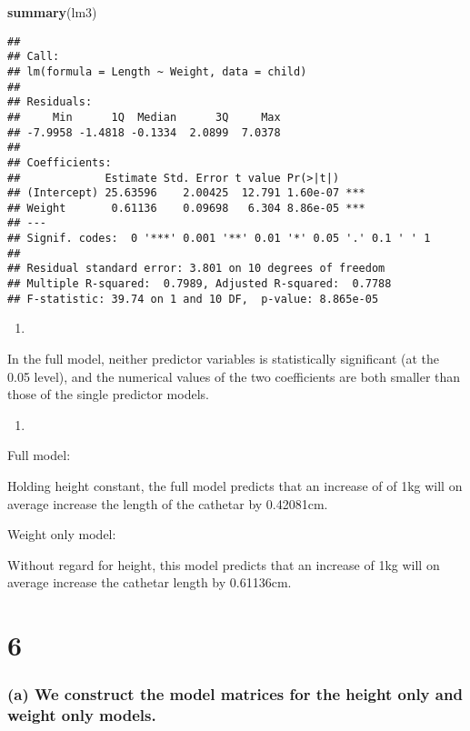\documentclass[]{article}
\newenvironment{Shaded}{\begin{snugshade}}{\end{snugshade}}
\newcommand{\KeywordTok}[1]{\textcolor[rgb]{0.13,0.29,0.53}{\textbf{#1}}}
\newcommand{\NormalTok}[1]{#1}
\begin{document}
\begin{Shaded}
\begin{Highlighting}[]
\KeywordTok{summary}\NormalTok{(lm3)}
\end{Highlighting}
\end{Shaded}

\begin{verbatim}
## 
## Call:
## lm(formula = Length ~ Weight, data = child)
## 
## Residuals:
##     Min      1Q  Median      3Q     Max 
## -7.9958 -1.4818 -0.1334  2.0899  7.0378 
## 
## Coefficients:
##             Estimate Std. Error t value Pr(>|t|)    
## (Intercept) 25.63596    2.00425  12.791 1.60e-07 ***
## Weight       0.61136    0.09698   6.304 8.86e-05 ***
## ---
## Signif. codes:  0 '***' 0.001 '**' 0.01 '*' 0.05 '.' 0.1 ' ' 1
## 
## Residual standard error: 3.801 on 10 degrees of freedom
## Multiple R-squared:  0.7989, Adjusted R-squared:  0.7788 
## F-statistic: 39.74 on 1 and 10 DF,  p-value: 8.865e-05
\end{verbatim}

\begin{enumerate}
\def\labelenumi{(\alph{enumi})}
\item
\end{enumerate}

In the full model, neither predictor variables is statistically
significant (at the 0.05 level), and the numerical values of the two
coefficients are both smaller than those of the single predictor models.

\begin{enumerate}
\def\labelenumi{(\alph{enumi})}
\setcounter{enumi}{1}
\item
\end{enumerate}

Full model:

Holding height constant, the full model predicts that an increase of of
1kg will on average increase the length of the cathetar by 0.42081cm.

Weight only model:

Without regard for height, this model predicts that an increase of 1kg
will on average increase the cathetar length by 0.61136cm.

\section{6}\label{section-4}

\subsubsection{(a) We construct the model matrices for the height only
and weight only
models.}\label{a-we-construct-the-model-matrices-for-the-height-only-and-weight-only-models.}
\end{document}
